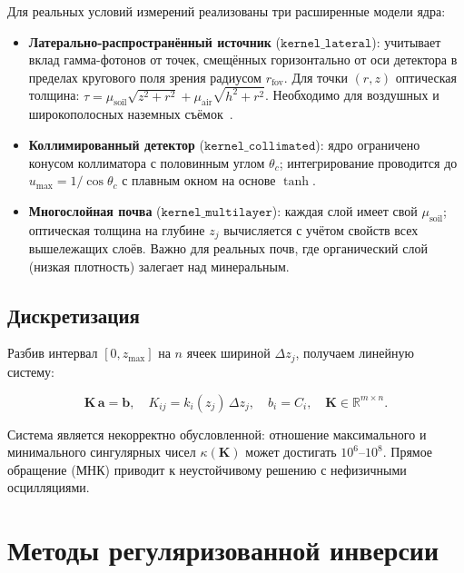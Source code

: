 \documentclass[12pt,a4paper]{article}
\newcommand{\va}{\mathbf{a}}
\newcommand{\vb}{\mathbf{b}}
\newcommand{\mK}{\mathbf{K}}
\begin{document}
Для реальных условий измерений реализованы три расширенные модели ядра:

\begin{itemize}[leftmargin=*,itemsep=2pt]
  \item \textbf{Латерально-распространённый источник} ($\texttt{kernel\_lateral}$):
        учитывает вклад гамма-фотонов от точек, смещённых
        горизонтально от оси детектора в пределах кругового
        поля зрения радиусом $r_{\mathrm{fov}}$.
        Для точки $(r, z)$ оптическая толщина:
        $\tau = \mu_{\mathrm{soil}}\sqrt{z^2 + r^2} + \mu_{\mathrm{air}}\sqrt{h^2 + r^2}$.
        Необходимо для воздушных и широкополосных наземных съёмок~\citep{Tyler2008}.

  \item \textbf{Коллимированный детектор} ($\texttt{kernel\_collimated}$):
        ядро ограничено конусом коллиматора с половинным углом
        $\theta_c$;
        интегрирование проводится до $u_{\max} = 1/\cos\theta_c$
        с плавным окном на основе $\tanh$.

  \item \textbf{Многослойная почва} ($\texttt{kernel\_multilayer}$):
        каждая слой имеет свой $\mu_{\mathrm{soil}}$;
        оптическая толщина на глубине $z_j$ вычисляется
        с учётом свойств всех вышележащих слоёв.
        Важно для реальных почв, где органический слой
        (низкая плотность) залегает над минеральным.
\end{itemize}

\subsection{Дискретизация}
\label{sub:discretization}

Разбив интервал $[0, z_{\max}]$ на $n$ ячеек шириной $\Delta z_j$,
получаем линейную систему:

\begin{equation}
  \mK\, \va = \vb,\quad
  K_{ij} = k_i(z_j)\, \Delta z_j,\quad
  b_i = C_i,\quad
  \mK \in \mathbb{R}^{m \times n}.
  \label{eq:linear}
\end{equation}

Система является некорректно обусловленной: отношение максимального
и минимального сингулярных чисел $\kappa(\mK)$ может достигать $10^6$--$10^8$.
Прямое обращение (МНК) приводит к неустойчивому решению с
 нефизичными осцилляциями.


\section{Методы регуляризованной инверсии}
\label{sec:solvers}
\end{document}
